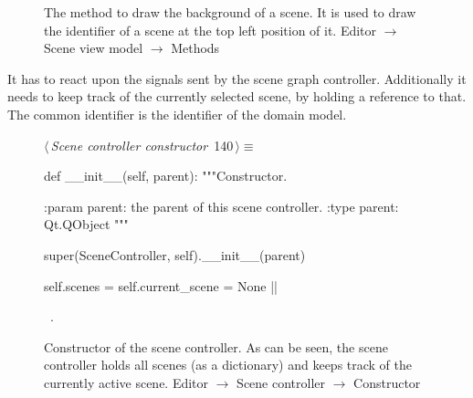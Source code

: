 \documentclass[%
    a4paper,    %
    justified,  %
    nobib,      %
    openany     %
]{tufte-book}
\makeatletter
\renewcommand{\label}[1]{\@tufte@label{##1}}%
\makeatother
\begin{document}
\begin{figure}[!htbp]
\begin{flushleft}
\begin{minipage}{\linewidth}
\begin{list}{}{\setlength{\itemsep}{-\parsep}\setlength{\itemindent}{-\leftmargin}}
\item{}
\end{list}
\end{minipage}\vspace{4ex}
\end{flushleft}
\caption{The method to draw the background of a scene. It is used to draw the
  identifier of a scene at the top left position of it.
  \newline{}\newline{}Editor $\rightarrow$ Scene view model $\rightarrow$
  Methods}
\end{figure}

 It has to
react upon the signals sent by the scene graph controller. Additionally it needs
to keep track of the currently selected scene, by holding a reference to that.
The common identifier is the identifier of the domain model.

\begin{figure}[!htbp]
\begin{flushleft} \small
\begin{minipage}{\linewidth}\label{scrap91}\raggedright\small
{} $\langle\,${\itshape Scene controller constructor}\nobreak\ {\footnotesize {140}}$\,\rangle\equiv$
\vspace{-1ex}
\begin{pythoncode}
def __init__(self, parent):
    """Constructor.

    :param parent: the parent of this scene controller.
    :type parent: Qt.QObject
    """

    super(SceneController, self).__init__(parent)

    self.scenes = {}
    self.current_scene = None
|\NWsep|
\end{pythoncode}
\vspace{1.5ex}
\footnotesize
\begin{list}{}{\setlength{\itemsep}{-\parsep}\setlength{\itemindent}{-\leftmargin}}
\item \NWtxtMacroRefIn\ .

\item{}
\end{list}
\end{minipage}\vspace{4ex}
\end{flushleft}
\caption{Constructor of the scene controller. As can be seen, the scene
  controller holds all scenes (as a dictionary) and keeps track of the currently
  active scene.
  \newline{}\newline{}Editor $\rightarrow$ Scene controller $\rightarrow$
  Constructor}
\end{figure}
\end{document}
